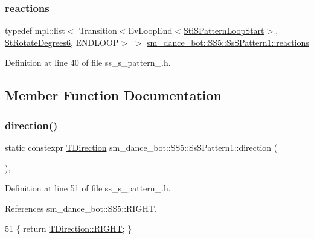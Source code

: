 \subsubsection{\texorpdfstring{reactions}{reactions}}
{\footnotesize\ttfamily typedef mpl\+::list$<$ Transition$<$Ev\+Loop\+End$<$\hyperlink{structsm__dance__bot_1_1s__pattern__states_1_1StiSPatternLoopStart}{Sti\+S\+Pattern\+Loop\+Start}$>$, \hyperlink{structsm__dance__bot_1_1StRotateDegrees6}{St\+Rotate\+Degrees6}, E\+N\+D\+L\+O\+OP$>$ $>$ \hyperlink{structsm__dance__bot_1_1SS5_1_1SsSPattern1_a6c5b86a52543caf627a571c543f6eda8}{sm\+\_\+dance\+\_\+bot\+::\+S\+S5\+::\+Ss\+S\+Pattern1\+::reactions}}



Definition at line 40 of file ss\+\_\+s\+\_\+pattern\+\_.\+h.



\subsection{Member Function Documentation}
\mbox{\label{structsm__dance__bot_1_1SS5_1_1SsSPattern1_abe6ab6e7e6630e67566c0fee58ce565f}} 
\subsubsection{\texorpdfstring{direction()}{direction()}}
{\footnotesize\ttfamily static constexpr \hyperlink{namespacesm__dance__bot_1_1SS5_aaa01c87b9245bbff2b581cefd6f3b346}{T\+Direction} sm\+\_\+dance\+\_\+bot\+::\+S\+S5\+::\+Ss\+S\+Pattern1\+::direction (\begin{DoxyParamCaption}{ }\end{DoxyParamCaption})\hspace{0.3cm}{\ttfamily [inline]}, {\ttfamily [static]}}



Definition at line 51 of file ss\+\_\+s\+\_\+pattern\+\_.\+h.



References sm\+\_\+dance\+\_\+bot\+::\+S\+S5\+::\+R\+I\+G\+HT.


\begin{DoxyCode}
51 \{ \textcolor{keywordflow}{return} \hyperlink{namespacesm__dance__bot_1_1SS5_aaa01c87b9245bbff2b581cefd6f3b346a21507b40c80068eda19865706fdc2403}{TDirection::RIGHT}; \}
\end{DoxyCode}
\mbox{\label{structsm__dance__bot_1_1SS5_1_1SsSPattern1_a32bf83535c603665005956c1a8cf71a7}} 
